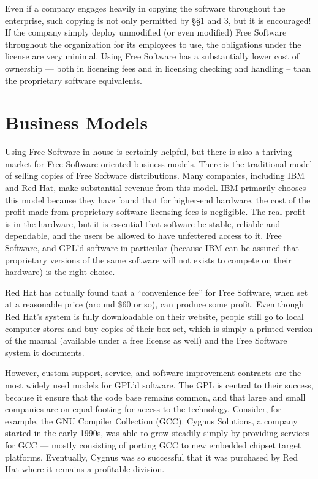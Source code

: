 \documentclass[12pt]{report}
\begin{document}
Even if a company engages heavily in copying the software throughout the
enterprise, such copying is not only permitted by \S\S 1 and 3, but it is
encouraged!  If the company simply deploy unmodified (or even modified)
Free Software throughout the organization for its employees to use, the
obligations under the license are very minimal.  Using Free Software has a
substantially lower cost of ownership --- both in licensing fees and in
licensing checking and handling -- than the proprietary software
equivalents.

\section{Business Models}
\label{Business Models}

Using Free Software in house is certainly helpful, but there is also a
thriving market for Free Software-oriented business models.  There is the
traditional model of selling copies of Free Software distributions.  Many
companies, including IBM and Red Hat, make substantial revenue from this
model.  IBM primarily chooses this model because they have found that for
higher-end hardware, the cost of the profit made from proprietary software
licensing fees is negligible.  The real profit is in the hardware, but it is
essential that software be stable, reliable and dependable, and the users
be allowed to have unfettered access to it.  Free Software, and GPL'd
software in particular (because IBM can be assured that proprietary
versions of the same software will not exists to compete on their
hardware) is the right choice.

Red Hat has actually found that a ``convenience fee'' for Free Software,
when set at a reasonable price (around \$60 or so), can produce some
profit.  Even though Red Hat's system is fully downloadable on their
website, people still go to local computer stores and buy copies of their
box set, which is simply a printed version of the manual (available under
a free license as well) and the Free Software system it documents.

\medskip

However, custom support, service, and software improvement contracts are
the most widely used models for GPL'd software.  The GPL is central to
their success, because it ensure that the code base remains common, and
that large and small companies are on equal footing for access to the
technology.  Consider, for example, the GNU Compiler Collection (GCC).
Cygnus Solutions, a company started in the early 1990s, was able to grow
steadily simply by providing services for GCC --- mostly consisting of
porting GCC to new embedded chipset target platforms.  Eventually, Cygnus
was so successful that it was purchased by Red Hat where it remains a
profitable division.
\end{document}
